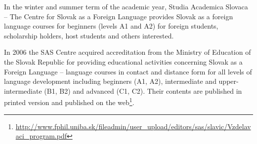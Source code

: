 In the winter and summer term of the academic year, Studia Academica Slovaca – The Centre for Slovak as a Foreign Language provides Slovak as a foreign language courses for beginners (levels A1 and A2) for foreign students, scholarship holders, host students and others interested.

In 2006 the SAS Centre acquired accreditation from the Ministry of Education of the Slovak Republic for providing educational activities concerning Slovak as a Foreign Language – language courses in contact and distance form for all levels of language development including beginners (A1, A2), intermediate and upper-intermediate (B1, B2) and advanced (C1, C2). Their contents are published in printed version \cite{pekarovicova2007} and published on the web\footnote{\url{http://www.fphil.uniba.sk/fileadmin/user_upload/editors/sas/slavic/Vzdelavaci_program.pdf}}.
